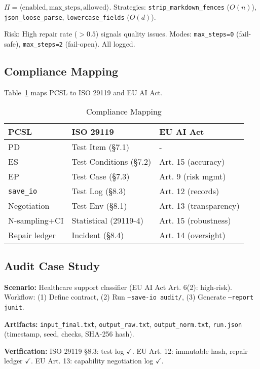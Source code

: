 \documentclass[sigconf]{acmart}
\begin{document}
\( \Pi = \langle \text{enabled}, \text{max\_steps}, \text{allowed} \rangle \). Strategies:
\texttt{strip\_markdown\_fences} (\( O(n) \)),
\texttt{json\_loose\_parse},
\texttt{lowercase\_fields} (\( O(d) \)).

Risk: High repair rate (\( > 0.5 \)) signals quality issues. Modes: \texttt{max\_steps=0} (fail-safe), \texttt{max\_steps=2} (fail-open). All logged.

\subsection{Compliance Mapping}

Table~\ref{tab:compliance} maps PCSL to ISO 29119 and EU AI Act.

\begin{table}[t]
\centering
\caption{Compliance Mapping}
\label{tab:compliance}
\scriptsize
\begin{tabular}{@{}p{2cm}p{2cm}p{2.3cm}@{}}
\toprule
\textbf{PCSL} & \textbf{ISO 29119} & \textbf{EU AI Act} \\
\midrule
PD & Test Item (§7.1) & - \\
ES & Test Conditions (§7.2) & Art. 15 (accuracy) \\
EP & Test Case (§7.3) & Art. 9 (risk mgmt) \\
\texttt{save\_io} & Test Log (§8.3) & Art. 12 (records) \\
Negotiation & Test Env (§8.1) & Art. 13 (transparency) \\
N-sampling+CI & Statistical (29119-4) & Art. 15 (robustness) \\
Repair ledger & Incident (§8.4) & Art. 14 (oversight) \\
\bottomrule
\end{tabular}
\end{table}

\subsection{Audit Case Study}

\textbf{Scenario:} Healthcare support classifier (EU AI Act Art. 6(2): high-risk). Workflow: (1) Define contract, (2) Run \texttt{--save-io audit/}, (3) Generate \texttt{--report junit}.

\textbf{Artifacts:} \texttt{input\_final.txt}, \texttt{output\_raw.txt}, \texttt{output\_norm.txt}, \texttt{run.json} (timestamp, seed, checks, SHA-256 hash).

\textbf{Verification:} ISO 29119 §8.3: test log \(\checkmark\). EU Art. 12: immutable hash, repair ledger \(\checkmark\). EU Art. 13: capability negotiation log \(\checkmark\).
\end{document}
